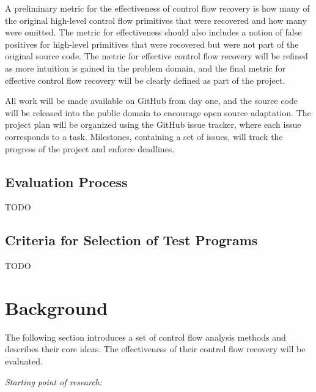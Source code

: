 \documentclass[12pt, a4paper]{article}
\begin{document}
A preliminary metric for the effectiveness of control flow recovery is how many of the original high-level control flow primitives that were recovered and how many were omitted. The metric for effectiveness should also includes a notion of false positives for high-level primitives that were recovered but were not part of the original source code. The metric for effective control flow recovery will be refined as more intuition is gained in the problem domain, and the final metric for effective control flow recovery will be clearly defined as part of the project.

All work will be made available on GitHub from day one, and the source code will be released into the public domain to encourage open source adaptation. The project plan will be organized using the GitHub issue tracker, where each issue corresponds to a task. Milestones, containing a set of issues, will track the progress of the project and enforce deadlines.

\subsection{Evaluation Process}

TODO

\subsection{Criteria for Selection of Test Programs}

TODO

\clearpage

\section{Background}

The following section introduces a set of control flow analysis methods and describes their core ideas. The effectiveness of their control flow recovery will be evaluated.

\textit{Starting point of research:}
\end{document}

